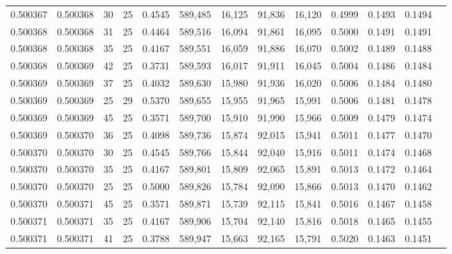 \begin{tabular}{rrrrrrrrrrrrr}
0.500367 & 0.500368 &    30 &  25 &                                     0.4545 & 589,485 &  16,125 &  91,836 &  16,120 & 0.4999 & 0.1493 & 0.1494 \\
0.500368 & 0.500368 &    31 &  25 &                                     0.4464 & 589,516 &  16,094 &  91,861 &  16,095 & 0.5000 & 0.1491 & 0.1491 \\
0.500368 & 0.500368 &    35 &  25 &                                     0.4167 & 589,551 &  16,059 &  91,886 &  16,070 & 0.5002 & 0.1489 & 0.1488 \\
0.500368 & 0.500369 &    42 &  25 &                                     0.3731 & 589,593 &  16,017 &  91,911 &  16,045 & 0.5004 & 0.1486 & 0.1484 \\
0.500369 & 0.500369 &    37 &  25 &                                     0.4032 & 589,630 &  15,980 &  91,936 &  16,020 & 0.5006 & 0.1484 & 0.1480 \\
0.500369 & 0.500369 &    25 &  29 &                                     0.5370 & 589,655 &  15,955 &  91,965 &  15,991 & 0.5006 & 0.1481 & 0.1478 \\
0.500369 & 0.500369 &    45 &  25 &                                     0.3571 & 589,700 &  15,910 &  91,990 &  15,966 & 0.5009 & 0.1479 & 0.1474 \\
0.500369 & 0.500370 &    36 &  25 &                                     0.4098 & 589,736 &  15,874 &  92,015 &  15,941 & 0.5011 & 0.1477 & 0.1470 \\
0.500370 & 0.500370 &    30 &  25 &                                     0.4545 & 589,766 &  15,844 &  92,040 &  15,916 & 0.5011 & 0.1474 & 0.1468 \\
0.500370 & 0.500370 &    35 &  25 &                                     0.4167 & 589,801 &  15,809 &  92,065 &  15,891 & 0.5013 & 0.1472 & 0.1464 \\
0.500370 & 0.500370 &    25 &  25 &                                     0.5000 & 589,826 &  15,784 &  92,090 &  15,866 & 0.5013 & 0.1470 & 0.1462 \\
0.500370 & 0.500371 &    45 &  25 &                                     0.3571 & 589,871 &  15,739 &  92,115 &  15,841 & 0.5016 & 0.1467 & 0.1458 \\
0.500371 & 0.500371 &    35 &  25 &                                     0.4167 & 589,906 &  15,704 &  92,140 &  15,816 & 0.5018 & 0.1465 & 0.1455 \\
0.500371 & 0.500371 &    41 &  25 &                                     0.3788 & 589,947 &  15,663 &  92,165 &  15,791 & 0.5020 & 0.1463 & 0.1451 \\

\end{tabular}
